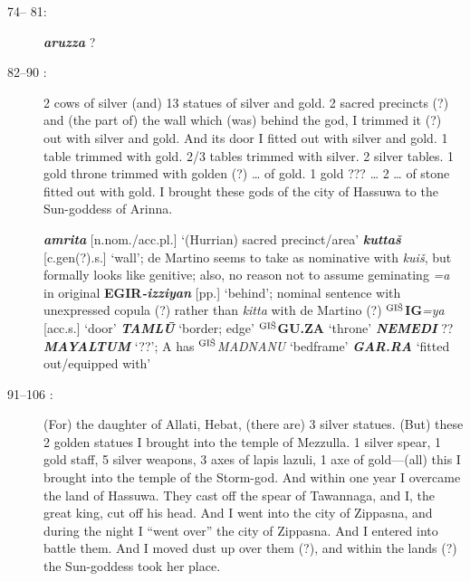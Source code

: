 \documentclass[10pt]{article}
\newcommand{\supersc}[1]{$^{\textrm{\scriptsize{#1}}}$}  	%
\newcommand{\bit}[1]{\textbf{\textit{#1}}}				%
\newcommand{\p}[1]{{\tiny[{#1}]}}					%
\newcommand{\hith}{\textsubwedge{h}}
\newcommand{\wood}{\supersc{GI\v{S}}}
\renewcommand{\.}[1]{\textsubdot{#1}}
\begin{document}
\begin{description}
\begin{notes}
\end{notes}

\item[74-- 81:] 

\begin{notes} 

\bit{aruzza} ?

\end{notes}

\item[82--90 :] 2 cows of silver (and) 13 statues of silver and gold. 2 sacred precincts (?) and (the part of) the wall which (was) behind the god, I trimmed it (?) out with silver and gold. And its door I fitted out with silver and gold. 1 table trimmed with gold. 2/3 tables trimmed with silver. 2 silver tables. 1 gold throne trimmed with golden (?) {\ldots} of gold. 1 gold ??? {\ldots} 2 {\ldots} of stone fitted out with gold. I brought these gods of the city of Hassuwa to the Sun-goddess of Arinna.


\begin{notes}

\bit{{\hith}amrita} \p{n.nom./acc.pl.} `(Hurrian) sacred precinct/area' \bit{kutta\v{s}} \p{c.gen(?).s.} `wall'; de Martino seems to take as nominative with \textit{kui\v{s}}, but formally looks like genitive; also, no reason not to assume geminating \textit{=a} in original \textbf{EGIR}\bit{-izziyan} \p{pp.} `behind'; nominal sentence with unexpressed copula (?) rather than \textit{kitta} with de Martino (?) \textbf{{\wood}IG}\textit{=ya} \p{acc.s.} `door' \bit{TAML\=U} `border; edge' \textbf{{\wood}GU.ZA} `throne' \bit{NEMEDI} ?? \bit{MAYALTUM} `??'; A has {\wood}\textit{MADNANU} `bedframe' \bit{GAR.RA} `fitted out/equipped with' 

\end{notes}

\item[91--106 :] (For) the daughter of Allati, Hebat, (there are) 3 silver statues. (But) these 2 golden statues I brought into the temple of Mezzulla. 1 silver spear, 1 gold staff, 5 silver weapons, 3 axes of lapis lazuli, 1 axe of gold---(all) this I brought into the temple of the Storm-god. And within one year I overcame the land of Hassuwa. They cast off the spear of Tawannaga, and I, the great king, cut off his head. And I went into the city of Zippasna, and during the night I ``went over'' the city of Zippasna.  And I entered into battle them. And I moved dust up over them (?), and within the lands (?) the Sun-goddess took her place. 



\end{description}
\end{document}
